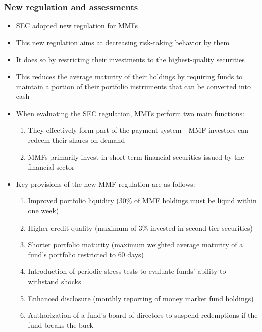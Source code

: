 \documentclass[11pt]{beamer}
\begin{document}
\begin{frame}
\frametitle{New regulation and assessments}
\begin{itemize}
\item SEC adopted new regulation for MMFs
\item This new regulation aims at decreasing risk-taking behavior by them
\item It does so by restricting their investments to the highest-quality securities
\item This reduces the average maturity of their holdings by requiring funds to maintain a portion of their portfolio instruments that can be converted into cash
\item When evaluating the SEC regulation, MMFs perform two main functions:
\begin{enumerate}
\item They effectively form part of the payment system - MMF investors can redeem their shares on demand
\item MMFs primarily invest in short term financial securities issued by the financial sector
\end{enumerate}
\end{itemize}
\end{frame}

\begin{frame}
\begin{itemize}
\item Key provisions of the new MMF regulation are as follows:
\begin{enumerate}
\item Improved portfolio liquidity ($30$\% of MMF holdings must be liquid within one week)
 \item Higher credit quality (maximum of $3$\% invested in second-tier
securities)
\item Shorter portfolio maturity (maximum weighted average maturity
of a fund’s portfolio restricted to $60$ days)
 \item Introduction of periodic stress tests to evaluate funds’ ability to withstand shocks
 \item Enhanced disclosure (monthly reporting of money market fund holdings)
 \item Authorization of a fund’s board of directors to suspend redemptions if the fund breaks the buck
\end{enumerate}
\end{itemize}
\end{frame}
\end{document}
